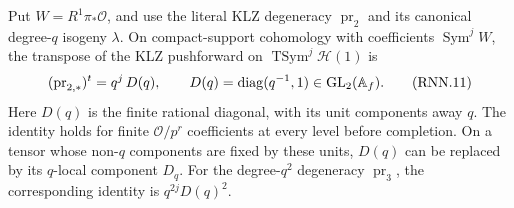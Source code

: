 \begin{lemma}
\label{AC-K33-ray-degeneracy}
Put \(W=R^1\pi_*\mathcal O\), and use the literal KLZ
degeneracy \(\operatorname{pr}_2\) and its canonical degree-\(q\)
isogeny \(\lambda\).
On compact-support cohomology with coefficients
\(\operatorname{Sym}^jW\), the transpose of the KLZ pushforward
on \(\operatorname{TSym}^j\mathcal H(1)\) is
\[
 (\operatorname{pr}_{2,*})^t
       =q^j\,D(q),\qquad
 D(q)=\operatorname{diag}(q^{-1},1)\in{\rm GL}_2(\mathbb A_f).
 \tag{RNN.11}
\]
Here \(D(q)\) is the finite rational diagonal, with its unit
components away \(q\).  The identity holds for finite
\(\mathcal O/p^r\) coefficients at every level before completion.
On a tensor whose non-\(q\) components are fixed by these units,
\(D(q)\) can be replaced by its \(q\)-local component \(D_q\).
For the degree-\(q^2\) degeneracy \(\operatorname{pr}_3\), the
corresponding identity is \(q^{2j}D(q)^2\).
\end{lemma}
